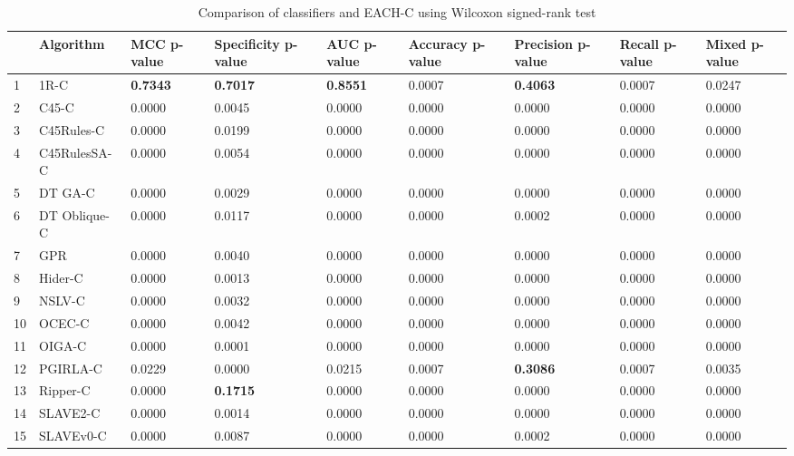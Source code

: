 \begin{table}
\footnotesize
\caption{Comparison of classifiers and EACH-C using Wilcoxon signed-rank test}
\label{tab:wilcoxon comparison}
\begin{tabular}{lllllllll}
\hline
 & Algorithm & MCC p-value & Specificity p-value & AUC p-value & Accuracy p-value & Precision p-value & Recall p-value & Mixed p-value \\
\hline
1 & 1R-C & \textbf{0.7343} & \textbf{0.7017} & \textbf{0.8551} & 0.0007 & \textbf{0.4063} & 0.0007 & 0.0247 \\
2 & C45-C & 0.0000 & 0.0045 & 0.0000 & 0.0000 & 0.0000 & 0.0000 & 0.0000 \\
3 & C45Rules-C & 0.0000 & 0.0199 & 0.0000 & 0.0000 & 0.0000 & 0.0000 & 0.0000 \\
4 & C45RulesSA-C & 0.0000 & 0.0054 & 0.0000 & 0.0000 & 0.0000 & 0.0000 & 0.0000 \\
5 & DT GA-C & 0.0000 & 0.0029 & 0.0000 & 0.0000 & 0.0000 & 0.0000 & 0.0000 \\
6 & DT Oblique-C & 0.0000 & 0.0117 & 0.0000 & 0.0000 & 0.0002 & 0.0000 & 0.0000 \\
7 & GPR & 0.0000 & 0.0040 & 0.0000 & 0.0000 & 0.0000 & 0.0000 & 0.0000 \\
8 & Hider-C & 0.0000 & 0.0013 & 0.0000 & 0.0000 & 0.0000 & 0.0000 & 0.0000 \\
9 & NSLV-C & 0.0000 & 0.0032 & 0.0000 & 0.0000 & 0.0000 & 0.0000 & 0.0000 \\
10 & OCEC-C & 0.0000 & 0.0042 & 0.0000 & 0.0000 & 0.0000 & 0.0000 & 0.0000 \\
11 & OIGA-C & 0.0000 & 0.0001 & 0.0000 & 0.0000 & 0.0000 & 0.0000 & 0.0000 \\
12 & PGIRLA-C & 0.0229 & 0.0000 & 0.0215 & 0.0007 & \textbf{0.3086} & 0.0007 & 0.0035 \\
13 & Ripper-C & 0.0000 & \textbf{0.1715} & 0.0000 & 0.0000 & 0.0000 & 0.0000 & 0.0000 \\
14 & SLAVE2-C & 0.0000 & 0.0014 & 0.0000 & 0.0000 & 0.0000 & 0.0000 & 0.0000 \\
15 & SLAVEv0-C & 0.0000 & 0.0087 & 0.0000 & 0.0000 & 0.0002 & 0.0000 & 0.0000 \\
\hline
\end{tabular}
\end{table}
